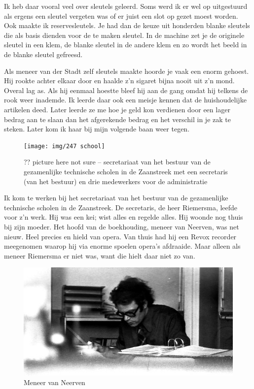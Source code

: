 \documentclass[10pt,twoside, openright]{memoir}
\begin{document}
Ik heb daar vooral veel over sleutels geleerd. Soms werd ik er wel op uitgestuurd als ergens een sleutel vergeten was of er juist een slot op gezet moest worden. Ook maakte ik reservesleutels. Je had dan de keuze uit honderden blanke sleutels die als basis dienden voor de te maken sleutel. In de machine zet je de originele sleutel in een klem, de blanke sleutel in de andere klem en zo wordt het beeld in de blanke sleutel gefreesd. 

Als meneer van der Stadt zelf sleutels maakte hoorde je vaak een enorm gehoest. Hij rookte achter elkaar door en haalde z’n sigaret bijna nooit uit z’n mond. Overal lag as. Als hij eenmaal hoestte bleef hij aan de gang omdat hij telkens de rook weer inademde. Ik leerde daar ook een meisje kennen dat de huishoudelijke artikelen deed. Later leerde ze me hoe je geld kon verdienen door een lager bedrag aan te slaan dan het afgerekende bedrag en het verschil in je zak te steken. Later kom ik haar bij mijn volgende baan weer tegen. 

\begin{figure}
\texttt{[image: img/247 school]}
\caption*{\footnotesize ?? picture here not sure -- secretariaat van het bestuur van de gezamenlijke technische scholen in de Zaanstreek met een secretaris (van het bestuur) en drie medewerkers voor de administratie}
\end{figure}

Ik kom te werken bij het secretariaat van het bestuur van de gezamenlijke technische scholen in de Zaanstreek. De secretaris, de heer Riemersma, leefde voor z'n werk. Hij was een kei; wist alles en regelde alles. Hij woonde nog thuis bij zijn moeder. Het hoofd van de boekhouding, meneer van Neerven, was net nieuw. Heel precies en hield van opera. Van thuis had hij een Revox recorder meegenomen waarop hij via enorme spoelen opera's afdraaide. Maar alleen als meneer Riemersma er niet was, want die hielt daar niet zo van.

\begin{figure}
\includegraphics[width=\textwidth]{img/ch41/IMG_0002}
\caption*{\footnotesize Meneer van Neerven}
\end{figure}
\end{document}
